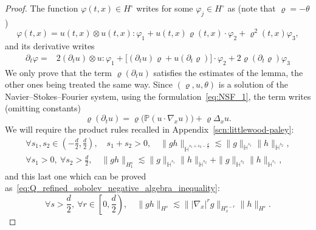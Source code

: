 \documentclass[10pt]{amsart}
\theoremstyle{definition}\newtheorem{defi}[theo]{Definition}\newtheorem{rema}[theo]{Remark}\newtheorem{exam}[theo]{Example}\newtheorem{exem}[theo]{Example}\newtheorem{nota}[theo]{Notation}
\newcommand{\bbH}{\mathbb{H}}
\newcommand{\bbP}{\mathbb{P}}
\newcommand{\Ssm}{H^{\circ}}
\let\oldforall\forall
\renewcommand*{\forall}{\mathrel{\oldforall}}
\begin{document}
\begin{proof}
The function $\varphi(t, x) \in \Ssm$ writes for some $\varphi_j \in \Ssm$ as (note that $\varrho = - \theta$)
\[
\varphi(t, x) = u(t, x) \otimes u(t, x) : \varphi_1 + u(t, x) \varrho(t, x) \cdot \varphi_2 + \varrho^2(t, x) \varphi_3,
\]
and its derivative writes
\begin{align*}
\partial_t \varphi = & 2 \left(\partial_t u\right) \otimes u : \varphi_1 + \big[\left(\partial_t u\right) \varrho + u \left(\partial_t \varrho \right)\big] \cdot \varphi_2 + 2 \varrho \left(\partial_t \varrho\right) \varphi_3
\end{align*}
We only prove that the term $\varrho (\partial_t u)$ satisfies the estimates of the lemma, the other ones being treated the same way. Since $(\varrho, u, \theta)$ is a solution of the Navier--Stokes--Fourier system, using the formulation~\eqref{eq:NSF_1}, the term writes (omitting constants)
\[
\varrho \left(\partial_t u\right) = \varrho \Big(\bbP \left(u \cdot \nabla_x u\right) \Big) + \varrho \Delta_x u.
\]
We will require the product rules recalled in Appendix~\ref{scn:littlewood-paley}:
\begin{gather}
\forall s_1, s_2 \in \left(-\frac{d}{2}, \frac{d}{2}\right), \quad s_1 + s_2 > 0, \quad \| g h \|_{ \dot{\bbH}^{s_1 + s_2 - \frac{d}{2}} } \lesssim \| g \|_{\dot{\bbH}^{s_1} } \| h \|_{\dot{\bbH}^{s_2} },
\label{eq:homogeneous_product}\\
\forall s_1 > 0,~\forall s_2 > \frac{d}{2}, \quad \| g h \|_{ H^s_1 } \lesssim \| g \|_{\dot{\bbH}^{s_1} } \| h \|_{\dot{\bbH}^{s_2} } + \| g \|_{\dot{\bbH}^{s_2} } \| h \|_{\dot{\bbH}^{s_1} },\label{eq:inhomogeneous_product}
\end{gather}
and this last one which can be proved as~\eqref{eq:Q_refined_sobolev_negative_algebra_inequality}:
\begin{equation}\label{eq:inhomogeneous_product_2}
\forall s > \frac{d}{2},~\forall r \in \left[0, \frac{d}{2}\right), \quad \| g h \|_{ H^s } \lesssim \| | \nabla_x |^r g \|_{ H^{s-r}_x } \| h \|_{H^{s} }.
\end{equation}


\end{proof}
\end{document}
